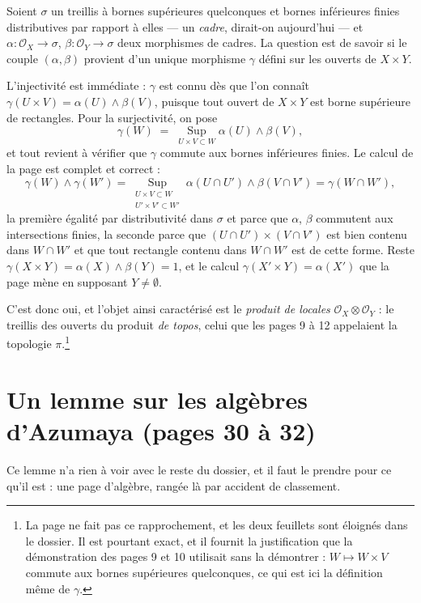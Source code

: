 \documentclass[11pt,a4paper]{article}
\begin{document}
Soient $\sigma$ un treillis à bornes supérieures quelconques et bornes
inférieures finies distributives par rapport à elles — un \emph{cadre}, dirait-on
aujourd'hui — et $\alpha : \mathcal{O}_{X} \to \sigma$,
$\beta : \mathcal{O}_{Y} \to \sigma$ deux morphismes de cadres. La question est
de savoir si le couple $(\alpha,\beta)$ provient d'un unique morphisme
$\gamma$ défini sur les ouverts de $X \times Y$.

L'injectivité est immédiate : $\gamma$ est connu dès que l'on connaît
$\gamma(U \times V) = \alpha(U) \wedge \beta(V)$, puisque tout ouvert de
$X \times Y$ est borne supérieure de rectangles. Pour la surjectivité, on pose
\[
\gamma(W) \;=\; \operatorname*{Sup}_{U \times V \subset W}
\alpha(U) \wedge \beta(V),
\]
et tout revient à vérifier que $\gamma$ commute aux bornes inférieures
finies. Le calcul de la page est complet et correct :
\[
\gamma(W) \wedge \gamma(W')
= \operatorname*{Sup}_{\substack{U \times V \subset W \\ U' \times V' \subset W'}}
\alpha(U \cap U') \wedge \beta(V \cap V')
= \gamma(W \cap W'),
\]
la première égalité par distributivité dans $\sigma$ et parce que $\alpha$,
$\beta$ commutent aux intersections finies, la seconde parce que
$(U \cap U') \times (V \cap V')$ est bien contenu dans $W \cap W'$ et que tout
rectangle contenu dans $W \cap W'$ est de cette forme. Reste
$\gamma(X \times Y) = \alpha(X) \wedge \beta(Y) = 1$, et le calcul
$\gamma(X' \times Y) = \alpha(X')$ que la page mène en supposant
$Y \neq \emptyset$.

C'est donc oui, et l'objet ainsi caractérisé est le \emph{produit de
locales} $\mathcal{O}_{X} \otimes \mathcal{O}_{Y}$ : le treillis des ouverts du
produit \emph{de topos}, celui que les pages 9 à 12 appelaient la topologie
$\pi$.\footnote{La page ne fait pas ce rapprochement, et les deux feuillets
sont éloignés dans le dossier. Il est pourtant exact, et il fournit la
justification que la démonstration des pages 9 et 10 utilisait sans la
démontrer : $W \mapsto W \times V$ commute aux bornes supérieures quelconques,
ce qui est ici la définition même de $\gamma$.}


\section*{Un lemme sur les algèbres d'Azumaya (pages 30 à 32)}

Ce lemme n'a rien à voir avec le reste du dossier, et il faut le prendre pour
ce qu'il est : une page d'algèbre, rangée là par accident de classement.
\end{document}
